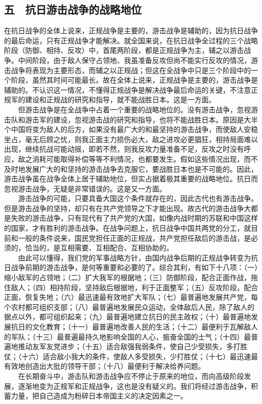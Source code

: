 \documentclass[cn,11pt,chinese]{elegantbook}
\def\myformat#1{\hfil\hfil #1}
\begin{document}
\subsection*{\myformat{五　抗日游击战争的战略地位}}
在抗日战争的全体上说来，正规战争是主要的，游击战争是辅助的，因为抗日战争的最后命运，只有正规战争才能解决。就全国来说，在抗日战争全过程的三个战略阶段（防御、相持、反攻）中，首尾两阶段，都是正规战争为主，辅之以游击战争。中间阶段，由于敌人保守占领地、我虽准备反攻但尚不能实行反攻的情况，游击战争将表现为主要形态，而辅之以正规战；但这在全战争中只是三个阶段中的一个阶段，虽然其时间可能最长。故在全体上说来，正规战争是主要的，游击战争是辅助的。不认识这一情况，不懂得正规战争是解决战争最后命运的关键，不注意正规军的建设和正规战的研究和指导，就不能战胜日本。这是一方面。\\
　　但游击战争是在全战争中占着一个重要的战略地位的。没有游击战争，忽视游击队和游击军的建设，忽视游击战的研究和指导，也将不能战胜日本。原因是大半个中国将变为敌人的后方，如果没有最广大的和最坚持的游击战争，而使敌人安稳坐占，毫无后顾之忧，则我正面主力损伤必大，敌之进攻必更猖狂，相持局面难以出现，继续抗战可能动摇，即若不然，则我反攻力量准备不足，反攻之时没有呼应，敌之消耗可能取得补偿等等不利情况，也都要发生。假如这些情况出现，而不及时地发展广大的和坚持的游击战争去克服它，要战胜日本也是不可能的。因此，游击战争虽在战争全体上居于辅助地位，但实占据着极其重要的战略地位。抗日而忽视游击战争，无疑是非常错误的。这是又一方面。\\
　　游击战争的可能，只要具备大国这个条件就存在的，因此古代也有游击战争。但是游击战争的坚持，却只有在共产党领导之下才能出现。故古代的游击战争大都是失败的游击战争，只有现代有了共产党的大国，如像内战时期的苏联和中国这样的国家，才有胜利的游击战争。在战争问题上，抗日战争中国共两党的分工，就目前和一般的条件说来，国民党担任正面的正规战，共产党担任敌后的游击战，是必须的，恰当的，是互相需要、互相配合、互相协助的。\\
　　由此可以懂得，我们党的军事战略方针，由国内战争后期的正规战争转变为抗日战争前期的游击战争，是何等重要和必要的了。综合其利，有如下十八项：（一）缩小敌军的占领地；（二）扩大我军的根据地；（三）防御阶段，配合正面作战，拖住敌人；（四）相持阶段，坚持敌后根据地，利于正面整军；（五）反攻阶段，配合正面，恢复失地；（六）最迅速最有效地扩大军队；（七）最普遍地发展共产党，每个农村都可组织支部；（八）最普遍地发展民众运动，全体敌后人民，除了敌人的据点以外，都可组织起来；（九）最普遍地建立抗日的民主政权；（十）最普遍地发展抗日的文化教育；（十一）最普遍地改善人民的生活；（十二）最便利于瓦解敌人的军队；（十三）最普遍最持久地影响全国的人心，振奋全国的士气；（十四）最普遍地推动友军友党进步；（十五）适合敌强我弱条件，使自己少受损失，多打胜仗；（十六）适合敌小我大的条件，使敌人多受损失，少打胜仗；（十七）最迅速最有效地创造出大批的领导干部；（十八）最便利于解决给养问题。\\
　　在长期奋斗中，游击队和游击战争应不停止于原来的地位，而向高级阶段发展，逐渐地变为正规军和正规战争，这也是没有疑义的。我们将经过游击战争，积蓄力量，把自己造成为粉碎日本帝国主义的决定因素之一。\\
\end{document}
